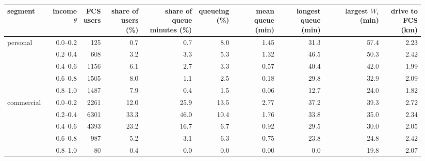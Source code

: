 \begin{tabular}{lrrrrrrrrr}\toprule
segment & income $\theta$ & \shortstack{FCS\\users} & \shortstack{share of\\users (\%)} & \shortstack{share of queue\\minutes (\%)} & \shortstack{queueing\\(\%)} & \shortstack{mean queue\\(min)} & \shortstack{longest\\queue (min)} & \shortstack{largest\\$W_i$ (min)} & \shortstack{drive to\\FCS (km)} \\ \midrule
personal & 0.0--0.2 & 125 & 0.7 & 0.7 & 8.0 & 1.45 & 31.3 & 57.4 & 2.23 \\
 & 0.2--0.4 & 608 & 3.2 & 3.3 & 5.3 & 1.32 & 46.5 & 50.3 & 2.42 \\
 & 0.4--0.6 & 1156 & 6.1 & 2.7 & 3.3 & 0.57 & 40.4 & 42.0 & 1.99 \\
 & 0.6--0.8 & 1505 & 8.0 & 1.1 & 2.5 & 0.18 & 29.8 & 32.9 & 2.09 \\
 & 0.8--1.0 & 1487 & 7.9 & 0.4 & 1.5 & 0.06 & 12.7 & 24.0 & 1.82 \\
commercial & 0.0--0.2 & 2261 & 12.0 & 25.9 & 13.5 & 2.77 & 37.2 & 39.3 & 2.72 \\
 & 0.2--0.4 & 6301 & 33.3 & 46.0 & 10.4 & 1.76 & 33.8 & 35.0 & 2.34 \\
 & 0.4--0.6 & 4393 & 23.2 & 16.7 & 6.7 & 0.92 & 29.5 & 30.0 & 2.05 \\
 & 0.6--0.8 & 987 & 5.2 & 3.1 & 6.3 & 0.75 & 23.8 & 24.8 & 2.42 \\
 & 0.8--1.0 & 80 & 0.4 & 0.0 & 0.0 & 0.00 & 0.0 & 19.8 & 2.07 \\
\bottomrule\end{tabular}
